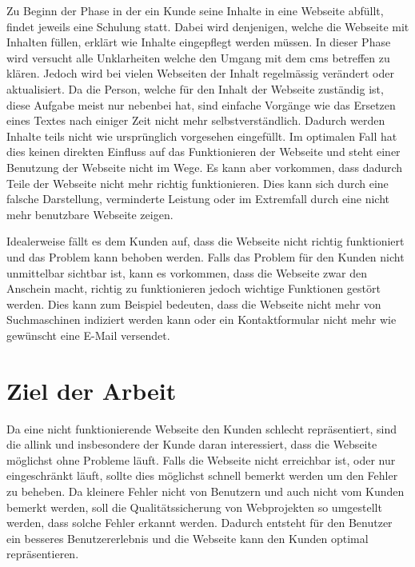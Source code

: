 Zu Beginn der Phase in der ein Kunde seine Inhalte in eine Webseite abfüllt, findet jeweils eine Schulung statt. Dabei wird denjenigen, welche die Webseite mit Inhalten füllen, erklärt wie Inhalte eingepflegt werden müssen. In dieser Phase wird versucht alle Unklarheiten welche den Umgang mit dem \acrshort{cms} betreffen zu klären. Jedoch wird bei vielen Webseiten der Inhalt regelmässig verändert oder aktualisiert. Da die Person, welche für den Inhalt der Webseite zuständig ist, diese Aufgabe meist nur nebenbei hat, sind einfache Vorgänge wie das Ersetzen eines Textes nach einiger Zeit nicht mehr selbstverständlich. Dadurch werden Inhalte teils nicht wie ursprünglich vorgesehen eingefüllt. Im optimalen Fall hat dies keinen direkten Einfluss auf das Funktionieren der Webseite und steht einer Benutzung der Webseite nicht im Wege. Es kann aber vorkommen, dass dadurch Teile der Webseite nicht mehr richtig funktionieren. Dies kann sich durch eine falsche Darstellung, verminderte Leistung oder im Extremfall durch eine nicht mehr benutzbare Webseite zeigen.

Idealerweise fällt es dem Kunden auf, dass die Webseite nicht richtig funktioniert und das Problem kann behoben werden. Falls das Problem für den Kunden nicht unmittelbar sichtbar ist, kann es vorkommen, dass die Webseite zwar den Anschein macht, richtig zu funktionieren jedoch wichtige Funktionen gestört werden. Dies kann zum Beispiel bedeuten, dass die Webseite nicht mehr von Suchmaschinen indiziert werden kann oder ein Kontaktformular nicht mehr wie gewünscht eine E-Mail versendet.

\section{Ziel der Arbeit}
\label{sec:ziel_der_arbeit}
Da eine nicht funktionierende Webseite den Kunden schlecht repräsentiert, sind die allink und insbesondere der Kunde daran interessiert, dass die Webseite möglichst ohne Probleme läuft. Falls die Webseite nicht erreichbar ist, oder nur eingeschränkt läuft, sollte dies möglichst schnell bemerkt werden um den Fehler zu beheben. Da kleinere Fehler nicht von Benutzern und auch nicht vom Kunden bemerkt werden, soll die Qualitätssicherung von Webprojekten so umgestellt werden, dass solche Fehler erkannt werden. Dadurch entsteht für den Benutzer ein besseres Benutzererlebnis und die Webseite kann den Kunden optimal repräsentieren.
